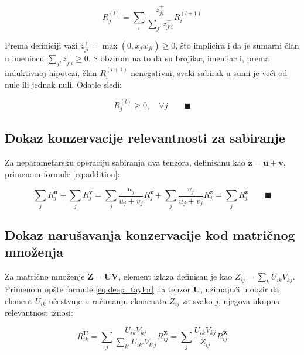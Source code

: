 \begin{equation*}
    R_j^{(l)} = \sum_i \frac{z_{ji}^+}{\sum_{j'} z_{j'i}^+} R_i^{(l+1)}
\end{equation*}

Prema definiciji važi $z_{ji}^+ = \max(0, x_j w_{ji}) \geq 0$, što implicira i da je sumarni član u imeniocu $\sum_{j'} z_{j'i}^+ \geq 0$. S obzirom na to da su brojilac, imenilac i, prema induktivnoj hipotezi, član $R_i^{(l+1)}$ nenegativni, svaki sabirak u sumi je veći od nule ili jednak nuli. Odatle sledi:

\begin{equation*}
    R_j^{(l)} \geq 0, \quad \forall j \qquad \blacksquare
\end{equation*}

\subsection{Dokaz konzervacije relevantnosti za sabiranje}
\label{appendix:addition}

Za neparametarsku operaciju sabiranja dva tenzora, definisanu kao $\mathbf{z} = \mathbf{u} + \mathbf{v}$, primenom formule \eqref{eq:addition}:

\begin{equation*}
    \sum_j R_j^{\mathbf{u}} + \sum_j R_j^{\mathbf{v}} = 
    \sum_j \frac{u_j}{u_j + v_j} R_j^{\mathbf{z}} + 
    \sum_j \frac{v_j}{u_j + v_j} R_j^{\mathbf{z}} = 
    \sum_j R_j^{\mathbf{z}} \qquad \blacksquare
\end{equation*}

\subsection{Dokaz narušavanja konzervacije kod matričnog množenja}
\label{appendix:multiplication}

Za matrično množenje $\mathbf{Z} = \mathbf{U}\mathbf{V}$, element izlaza definisan je kao $Z_{ij} = \sum_k U_{ik} V_{kj}$. Primenom opšte formule \eqref{eq:deep_taylor} na tenzor $\mathbf{U}$, uzimajući u obzir da element $U_{ik}$ učestvuje u računanju elemenata $Z_{ij}$ za svako $j$, njegova ukupna relevantnost iznosi:

\begin{equation*}
    R_{ik}^{\mathbf{U}} = \sum_j \frac{U_{ik} V_{kj}}{\sum_{k'} U_{ik'} V_{k'j}} R_{ij}^{\mathbf{Z}} = \sum_j \frac{U_{ik} V_{kj}}{Z_{ij}} R_{ij}^{\mathbf{Z}}
\end{equation*}

